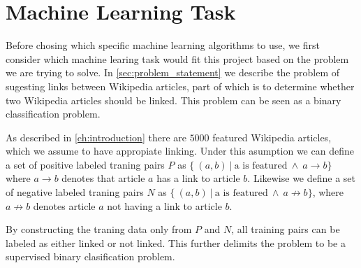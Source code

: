 

\section{Machine Learning Task}
Before chosing which specific machine learning algorithms to use, we first consider which machine learing task would fit this project based on the problem we are trying to solve. In \cref{sec:problem_statement} we describe the problem of sugesting links between Wikipedia articles, part of which is to determine whether two Wikipedia articles should be linked. This problem can be seen as a binary classification problem.

As described in \cref{ch:introduction} there are $5000$ featured Wikipedia articles, which we assume to have appropiate linking. Under this asumption we can define a set of positive labeled traning pairs $P$ as $\{\ (a,b)\ |\ \text{a is featured}\ \wedge\ a \to b \}$ where $a \to b$ denotes that article $a$ has a link to article $b$. Likewise we define a set of negative labeled traning pairs $N$ as  $\{\ (a,b)\ |\ \text{a is featured}\ \wedge\ a \not\to b \}$, where $a \not\to b$ denotes article $a$ not having a link to article $b$.

By constructing the traning data only from $P$ and $N$, all training pairs can be labeled as either linked or not linked. This further delimits the problem to be a supervised binary clasification problem.

